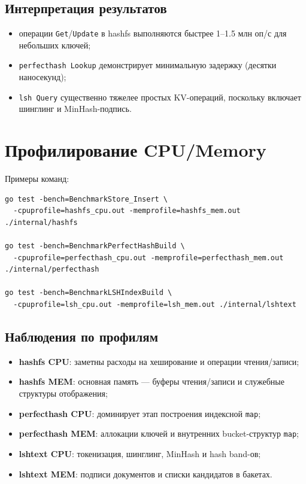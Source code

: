\documentclass{itmo}
\begin{document}
\subsection*{Интерпретация результатов}
\begin{itemize}
	\item операции \texttt{Get}/\texttt{Update} в hashfs выполняются быстрее 1--1.5 млн оп/с для небольших ключей;
	\item \texttt{perfecthash Lookup} демонстрирует минимальную задержку (десятки наносекунд);
	\item \texttt{lsh Query} существенно тяжелее простых KV-операций, поскольку включает шинглинг и MinHash-подпись.
\end{itemize}

\section{Профилирование CPU/Memory}

Примеры команд:
\begin{verbatim}
go test -bench=BenchmarkStore_Insert \
  -cpuprofile=hashfs_cpu.out -memprofile=hashfs_mem.out ./internal/hashfs

go test -bench=BenchmarkPerfectHashBuild \
  -cpuprofile=perfecthash_cpu.out -memprofile=perfecthash_mem.out ./internal/perfecthash

go test -bench=BenchmarkLSHIndexBuild \
  -cpuprofile=lsh_cpu.out -memprofile=lsh_mem.out ./internal/lshtext
\end{verbatim}

\subsection*{Наблюдения по профилям}
\begin{itemize}
	\item \textbf{hashfs CPU}: заметны расходы на хеширование и операции чтения/записи;
	\item \textbf{hashfs MEM}: основная память --- буферы чтения/записи и служебные структуры отображения;
	\item \textbf{perfecthash CPU}: доминирует этап построения индексной \texttt{map};
	\item \textbf{perfecthash MEM}: аллокации ключей и внутренних bucket-структур \texttt{map};
	\item \textbf{lshtext CPU}: токенизация, шинглинг, MinHash и hash band-ов;
	\item \textbf{lshtext MEM}: подписи документов и списки кандидатов в бакетах.
\end{itemize}
\end{document}
